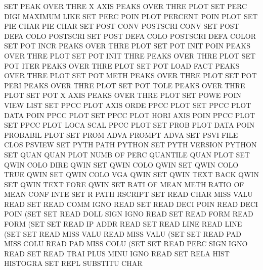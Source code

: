 SET      PEAK OVER THRE X    AXIS       PEAKS    OVER THRE PLOT
SET      PERC DIGI                      MAXIMUM  LIKE
SET      PERC POIN PLOT                 PERCENT  POIN PLOT
SET      PIE  CHAR                      PIE      CHAR
SET      POST CONV                      POSTSCRI CONV
SET      POST DEFA COLO                 POSTSCRI
SET      POST DEFA COLO                 POSTSCRI DEFA COLOR
SET      POT  INCR                      PEAKS    OVER THRE PLOT
SET      POT  INIT POIN                 PEAKS    OVER THRE PLOT
SET      POT  INIT THRE                 PEAKS    OVER THRE PLOT
SET      POT  ITER                      PEAKS    OVER THRE PLOT
SET      POT  LOAD FACT                 PEAKS    OVER THRE PLOT
SET      POT  METH                      PEAKS    OVER THRE PLOT
SET      POT  PERI                      PEAKS    OVER THRE PLOT
SET      POT  TOLE                      PEAKS    OVER THRE PLOT
SET      POT  X    AXIS                 PEAKS    OVER THRE PLOT
SET      POWE POIN VIEW                 LIST
SET      PPCC PLOT AXIS ORDE            PPCC     PLOT
SET      PPCC PLOT DATA POIN            PPCC     PLOT
SET      PPCC PLOT HORI AXIS POIN       PPCC     PLOT
SET      PPCC PLOT LOCA SCAL            PPCC     PLOT
SET      PROB PLOT DATA POIN            PROBABIL PLOT
SET      PROM ADVA                      PROMPT   ADVA
SET      PSVI FILE CLOS                 PSVIEW
SET      PYTH PATH                      PYTHON
SET      PYTH VERSION                   PYTHON
SET      QUAN QUAN PLOT NUMB OF   PERC  QUANTILE QUAN PLOT
SET      QWIN COLO DIRE                 QWIN
SET      QWIN COLO                      QWIN
SET      QWIN COLO TRUE                 QWIN
SET      QWIN COLO VGA                  QWIN
SET      QWIN TEXT BACK                 QWIN
SET      QWIN TEXT FORE                 QWIN
SET      RATI OF   MEAN METH            RATIO   OF    MEAN CONF INTE
SET      R    PATH                      RSCRIPT
SET      READ CHAR MISS VALU            READ
SET      READ COMM IGNO                 READ
SET      READ DECI POIN                 READ     DECI POIN (SET
SET      READ DOLL SIGN IGNO            READ
SET      READ FORM                      READ     FORM (SET
SET      READ IP   ADDR                 READ
SET      READ LINE                      READ     LINE (SET
SET      READ MISS VALU                 READ     MISS VALU (SET
SET      READ PAD  MISS COLU            READ     PAD  MISS COLU (SET
SET      READ PERC SIGN IGNO            READ
SET      READ TRAI PLUS MINU IGNO       READ
SET      RELA HIST                      HISTOGRA
SET      REPL                           SUBSTITU CHAR
